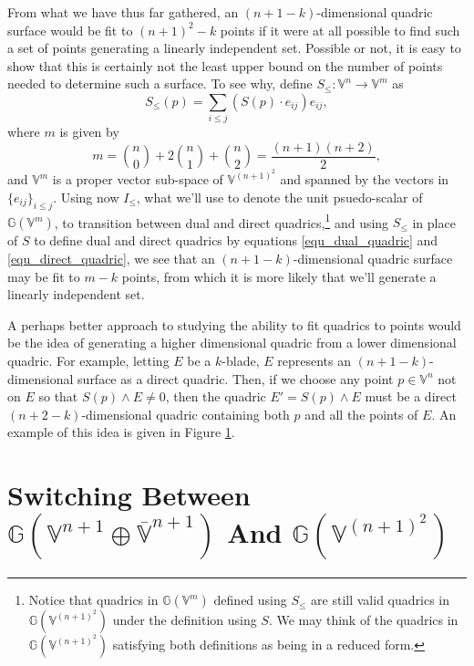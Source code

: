 \documentclass{birkjour}
\theoremstyle{definition}
\theoremstyle{remark}
\numberwithin{equation}{section}
\newcommand{\G}{\mathbb{G}}
\newcommand{\V}{\mathbb{V}}
\newcommand{\Vb}{\mathbb{\overline{V}}}
\begin{document}
From what we have thus far gathered, an $(n+1-k)$-dimensional quadric surface
would be fit to $(n+1)^2-k$ points if it were at all possible to find such a set
of points generating a linearly independent set.  Possible or not, it is easy to show that this
is certainly not the least upper bound on the number of points needed to determine
such a surface.  To see why, define $S_{\leq}:\V^n\to\V^m$ as
\begin{equation}
S_{\leq}(p) = \sum_{i\leq j}(S(p)\cdot e_{ij})e_{ij},
\end{equation}
where $m$ is given by
\begin{equation}
m = \binom{n}{0}+2\binom{n}{1}+\binom{n}{2} = \frac{(n+1)(n+2)}{2},
\end{equation}
and $\V^m$ is a proper vector sub-space of $\V^{(n+1)^2}$ and spanned
by the vectors in $\{e_{ij}\}_{i\leq j}$.
Using now $I_{\leq}$, what we'll use to denote the unit psuedo-scalar of $\G(\V^m)$,
to transition between dual and direct quadrics,\footnote{Notice that quadrics in $\G(\V^m)$
defined using $S_{\leq}$ are still valid quadrics in $\G(\V^{(n+1)^2})$ under the definition
using $S$.  We may think of the
quadrics in $\G(\V^{(n+1)^2})$ satisfying both definitions as being in a reduced form.}
and using $S_{\leq}$ in place of $S$
to define dual and direct quadrics by equations \eqref{equ_dual_quadric} and
\eqref{equ_direct_quadric}, we see that
an $(n+1-k)$-dimensional quadric surface may be fit to $m-k$ points, from which it
is more likely that we'll generate a linearly independent set.

A perhaps better approach to studying the ability to fit quadrics to
points would be the idea of generating a higher dimensional quadric
from a lower dimensional quadric.  For example, letting $E$ be a $k$-blade, $E$
represents an $(n+1-k)$-dimensional surface as a direct quadric.  Then,
if we choose any point $p\in\V^n$ not on $E$ so that $S(p)\wedge E\neq 0$,
then the quadric $E'=S(p)\wedge E$ must be a direct $(n+2-k)$-dimensional quadric containing
both $p$ and all the points of $E$.  An example of this idea is given in Figure \ref{}.



\section{Switching Between $\G(\V^{n+1}\oplus\Vb^{n+1})$ And $\G(\V^{(n+1)^2})$}
\end{document}
